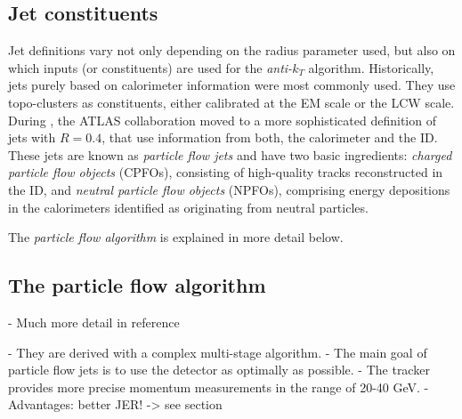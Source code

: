 \subsection{Jet constituents}
Jet definitions vary not only depending on the radius parameter used, but also on which inputs (or constituents) are used for the \emph{anti-$k_T$} algorithm. 
Historically, jets purely based on calorimeter information were most commonly used. They use topo-clusters as constituents, either calibrated at the EM scale or the LCW scale. 
During \RunTwo, the ATLAS collaboration moved to a more sophisticated definition of jets with $R=0.4$, that use information from both, the calorimeter and the ID. These jets are known as \emph{particle flow jets} and have two basic ingredients: \emph{charged particle flow objects} (CPFOs), consisting of high-quality tracks reconstructed in the ID, and \emph{neutral particle flow objects} (NPFOs), comprising energy depositions in the calorimeters identified as originating from neutral particles.

The \emph{particle flow algorithm} is explained in more detail below.

\subsection{The particle flow algorithm}
- Much more detail in reference

- They are derived with a complex multi-stage algorithm. 
- The main goal of particle flow jets is to use the detector as optimally as possible. 
- The tracker provides more precise momentum measurements in the range of 20-40 GeV. 
- Advantages: better JER! -> see section

